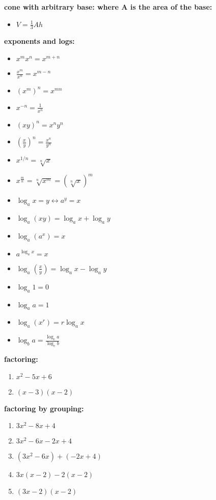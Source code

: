 \documentclass{article}
\begin{document}
\textbf{cone with arbitrary base: where A is the area of the base:}
	\begin{itemize}
		\item $V = \frac{1}{3}Ah$
	\end{itemize}

\textbf{exponents and logs:} 
	\begin{itemize}
		\item $x^mx^n = x^{m+n}$
		\item $\frac{x^m}{x^n} = x^{m-n}$
		\item $(x^m)^n = x^{mn}$
		\item $x^{-n} = \frac{1}{x^n}$
		\item $(xy)^n = x^ny^n$
		\item $(\frac{x}{y})^n = \frac{x^n}{y^n}$ \item $x^{1/n} = \sqrt[n]{x}$
		\item $x^{\frac{m}{n}} = \sqrt[n]{x^m} = (\sqrt[n]{x})^m$
		\item $\log_ax = y \leftrightarrow a^y = x$
		\item $\log_a(xy) = \log_ax + \log_ay$
		\item $\log_a(a^x) = x$
		\item $a^{\log_a x} = x$
		\item $\log_a(\frac{x}{y}) = \log_ax - \log_ay$
		\item $\log_a1 = 0$
		\item $\log_aa = 1$
		\item $\log_a(x^r) = r\log_ax$
		\item $\log_ba = \frac{\log_ca}{\log_cb}$
	\end{itemize}

\textbf{factoring:}
	\begin{enumerate}
		\item $x^2 - 5x + 6$
		\item $(x - 3)(x - 2)$
	\end{enumerate}

\textbf{factoring by grouping:}
	\begin{enumerate}
		\item $3x^2 -8x + 4$
		\item $3x^2 - 6x -2x + 4$
		\item $(3x^2 - 6x) + (-2x + 4)$
		\item $3x(x - 2) - 2(x - 2)$
		\item $(3x - 2)(x-2)$
	\end{enumerate}
\end{document}
